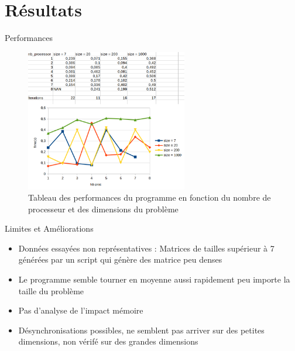 \documentclass{beamer}
\begin{document}
\section{Résultats}

\begin{frame}{Performances}
  \begin{figure}
    \centering
    \includegraphics[width=200pt]{perf.png}
    \caption{Tableau des performances du programme en fonction du nombre de processeur et des dimensions du problème}
  \end{figure}
\end{frame}

\begin{frame}{Limites et Améliorations}
  \begin{itemize}
    \item Données essayées non représentatives : Matrices de tailles supérieur à 7 générées par un script qui génère des matrice peu denses
    \item Le programme semble tourner en moyenne aussi rapidement peu importe la taille du problème
    \item Pas d'analyse de l'impact mémoire
    \item Désynchronisations possibles, ne semblent pas arriver sur des petites dimensions, non vérifé sur des grandes dimensions
  \end{itemize}
\end{frame}
\end{document}
